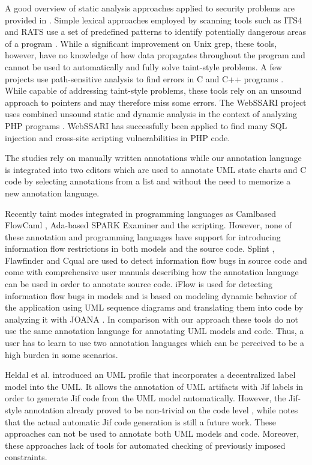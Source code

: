 A good overview of static analysis approaches applied to security problems are provided in \cite{ref_18_chess2004static}. Simple lexical approaches employed by scanning tools such as ITS4 and RATS use a set of predefined patterns to identify potentially dangerous areas of a program \cite{ref_82_wilander2002comparison}. While a significant improvement on Unix grep, these tools, however, have no knowledge of how data propagates throughout the program and cannot be used to automatically and fully solve taint-style problems.
A few projects use path-sensitive analysis to find errors in C and C++ programs \cite{ref_83_bush2000static,ref_84_hallem2002system,ref_85_livshits2003tracking}. While capable of addressing taint-style problems, these tools rely on an unsound approach to pointers and may therefore miss some errors. The WebSSARI project uses combined unsound static and dynamic analysis in the context of analyzing PHP programs \cite{ref_75_huang2004securing}. WebSSARI has successfully been applied to find many SQL injection and cross-site scripting vulnerabilities in PHP code.

 The studies rely on manually
written annotations while our annotation language is integrated
into two editors which are used to annotate UML state
charts and C code by selecting annotations from a list and
without the need to memorize a new annotation language.

Recently taint modes integrated in programming languages as Camlbased FlowCaml \cite{ref_32_simonet:report}, Ada-based SPARK Examiner \cite{ref_31_chapman:enforcing} and the scripting. However, none of these annotation and programming languages have support for introducing information flow
restrictions in both models and the source code.
Splint \cite{ref_30_david:splint}, Flawfinder \cite{ref_29_wheeler:flawfinder} and Cqual \cite{ref_28_umesh:cqual} are used to detect information flow bugs in source code and come with
comprehensive user manuals describing how the annotation
language can be used in order to annotate source code.
iFlow \cite{ref_27_iflow:kuzman} is used for detecting information flow bugs in
models and is based on modeling dynamic behavior of the
application using UML sequence diagrams and translating
them into code by analyzing it with JOANA \cite{ref_26_kit:joana}. In comparison with our approach these tools do not use the same
annotation language for annotating UML models and code.
Thus, a user has to learn to use two annotation languages
which can be perceived to be a high burden in some scenarios.


 Heldal et al. \cite{ref_25_heldal:bridging,ref_23_heldal:supporting} introduced an
UML profile that incorporates a decentralized label model into the UML. It allows the annotation of UML artifacts with
Jif \cite{ref_48_chong:jif} labels in order to generate Jif code from the UML
model automatically. However, the Jif-style annotation already
proved to be non-trivial on the code level \cite{ref_22_preibusch2011information}, while \cite{ref_23_heldal:supporting}
notes that the actual automatic Jif code generation is still a future
work. These approaches can not be used to annotate both UML
models and code. Moreover, these approaches lack of tools for
automated checking of previously imposed constraints.